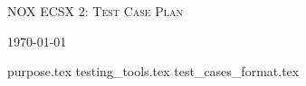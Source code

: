 \documentclass{article}
\begin{document}
\begin{titlepage}
    \centering
    {\scshape\LARGE NOX ECSX 2: Test Case Plan \par}
    \vfill
    {\large \today\par}
\end{titlepage}

\tableofcontents
\pagebreak


{purpose.tex}
{testing_tools.tex}
{test_cases_format.tex}
\end{document}
